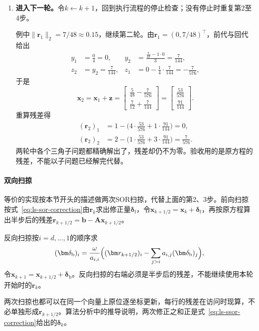 \begin{enumerate}
 \item \textbf{进入下一轮。}令$k\leftarrow k+1$，回到执行流程的停止检查；没有停止时重复第2至4步。

 例中$\lVert\bm r_1\rVert_2=7/48\approx0.15$，继续第二轮。由$\bm r_1=(0,7/48)^\top$，前代与回代给出
 \[
  \begin{aligned}
  y_1&=\frac{0}{4}=0, & y_2&=\frac{\tfrac7{48}-1\cdot0}{3}=\frac7{144},\\
  z_2&=y_2=\frac7{144}, & z_1&=0-\frac14\cdot\frac7{144}=-\frac7{576},
  \end{aligned}
 \]
 于是
 \[
  \bm x_2=\bm x_1+\bm z=\begin{bmatrix}\tfrac5{48}-\tfrac7{576}\\\tfrac7{12}+\tfrac7{144}\end{bmatrix}=\begin{bmatrix}\tfrac{53}{576}\\\tfrac{91}{144}\end{bmatrix}.
 \]
 重算残差得
 \[
  \begin{aligned}
  (\bm r_2)_1&=1-\bigl(4\cdot\tfrac{53}{576}+1\cdot\tfrac{91}{144}\bigr)=0,\\
  (\bm r_2)_2&=2-\bigl(1\cdot\tfrac{53}{576}+3\cdot\tfrac{91}{144}\bigr)=\tfrac7{576} .
  \end{aligned}
 \]
 两轮中各个三角子问题都精确解出了，残差却仍不为零。验收用的是原方程的残差，不能以子问题已经解完代替。
\end{enumerate}

\paragraph{双向扫掠}
等价的实现按本节开头的描述做两次SOR扫掠，代替上面的第2、3步。前向扫掠按式~\eqref{eq:ls-sor-correction}由$\bm r_k$求出修正量$\bm\delta_{\mathrm f}$，令$\bm x_{k+1/2}=\bm x_k+\bm\delta_{\mathrm f}$，再按原方程算出半步后的残差$\bm r_{k+1/2}=\bm b-\bm A\bm x_{k+1/2}$。

反向扫掠按$i=d,\ldots,1$的顺序求
\begin{equation}
 (\bm\delta_{\mathrm b})_i=\frac{\omega}{a_{i,i}}\Bigl((\bm r_{k+1/2})_i-\sum_{j>i}a_{i,j}(\bm\delta_{\mathrm b})_j\Bigr),
 \label{eq:ls-ssor-backward-sweep}
\end{equation}
令$\bm x_{k+1}=\bm x_{k+1/2}+\bm\delta_{\mathrm b}$。反向扫掠的右端必须是半步后的残差，不能继续使用本轮开始时的$\bm r_k$。

两次扫掠也都可以在同一个向量上原位逐坐标更新，每行的残差在访问时现算，不必单独形成$\bm r_{k+1/2}$。算法分析中的推导说明，两次修正之和正是式~\eqref{eq:ls-ssor-correction}给出的$\bm\delta_k$。

